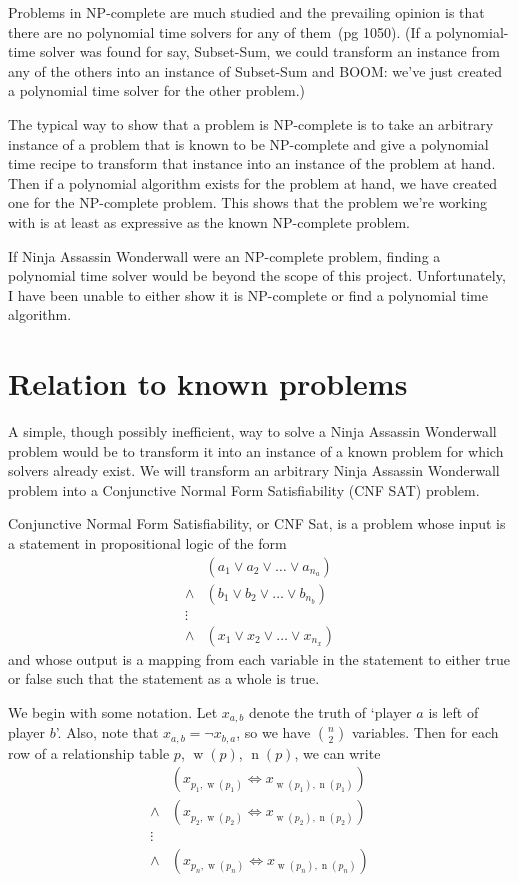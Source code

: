 \documentclass[12pt,x11names, rgb]{article}
\DeclareMathOperator{\w}{w}
\DeclareMathOperator{\n}{n}
\begin{document}
    Problems in NP-complete are much studied and the prevailing opinion is that there are no polynomial time solvers for any of them~\cite{clrs}(pg 1050). (If a polynomial-time solver was found for say, Subset-Sum, we could transform an instance from any of the others into an instance of Subset-Sum and BOOM: we've just created a polynomial time solver for the other problem.)

    The typical way to show that a problem is NP-complete is to take an arbitrary instance of a problem that is known to be NP-complete and give a polynomial time recipe to transform that instance into an instance of the problem at hand. Then if a polynomial algorithm exists for the problem at hand, we have created one for the NP-complete problem. This shows that the problem we're working with is at least as expressive as the known NP-complete problem.

    If Ninja Assassin Wonderwall were an NP-complete problem, finding a polynomial time solver would be beyond the scope of this project. Unfortunately, I have been unable to either show it is NP-complete or find a polynomial time algorithm. 

\section{Relation to known problems}
    A simple, though possibly inefficient, way to solve a Ninja Assassin Wonderwall problem would be to transform it into an instance of a known problem for which solvers already exist. We will transform an arbitrary Ninja Assassin Wonderwall problem into a Conjunctive Normal Form Satisfiability (CNF SAT) problem.

    Conjunctive Normal Form Satisfiability, or CNF Sat, is a problem whose input is a statement in propositional logic of the form
        \begin{align*} 
                    & (a_1 \vee a_2 \vee \ldots \vee a_{n_a}) \\
            \wedge  & (b_1 \vee b_2 \vee \ldots \vee b_{n_b})\\
            \vdots  &\\
            \wedge  & (x_1 \vee x_2 \vee \ldots \vee x_{n_x})
        \end{align*}
    and whose output is a mapping from each variable in the statement to either true or false such that the statement as a whole is true. 

    We begin with some notation. Let $x_{a,b}$ denote the truth of `player $a$ is left of player $b$'. Also, note that $x_{a,b} = \lnot x_{b,a}$, so we have $\binom{n}{2}$ variables. Then for each row of a relationship table $p$, $\w(p)$, $\n(p)$, we can write
        \begin{align*}
                    & (x_{p_1, \w(p_1)} \Leftrightarrow x_{\w(p_1), \n(p_1)})\\
            \wedge  & (x_{p_2, \w(p_2)} \Leftrightarrow x_{\w(p_2), \n(p_2)})\\
            \vdots  &\\
            \wedge  & (x_{p_n, \w(p_n)} \Leftrightarrow x_{\w(p_n), \n(p_n)})
        \end{align*}
\end{document}
